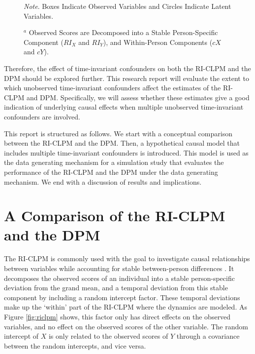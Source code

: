 \documentclass[
  a4paper,
  stu,
  floatsintext,
  donotrepeattitle]{apa7}
\begin{document}
\begin{figure}
\begin{minipage}[t]{\linewidth}
{\centering 

\begin{flushleft}
\textit{Note}. Boxes Indicate Observed Variables
and Circles Indicate Latent Variables.

$^a$ Observed Scores are Decomposed into a Stable Person-Specific
Component ($RI_X$ and $RI_Y$), and Within-Person Components ($cX$ and
$cY$).
\end{flushleft}

}

\end{minipage}%

\end{figure}

Therefore, the effect of time-invariant confounders on both the RI-CLPM
and the DPM should be explored further. This research report will
evaluate the extent to which unobserved time-invariant confounders
affect the estimates of the RI-CLPM and DPM. Specifically, we will
assess whether these estimates give a good indication of underlying
causal effects when multiple unobserved time-invariant confounders are
involved.

This report is structured as follows. We start with a conceptual
comparison between the RI-CLPM and the DPM. Then, a hypothetical causal
model that includes multiple time-invariant confounders is introduced.
This model is used as the data generating mechanism for a simulation
study that evaluates the performance of the RI-CLPM and the DPM under
the data generating mechanism. We end with a discussion of results and
implications.

\hypertarget{a-comparison-of-the-ri-clpm-and-the-dpm}{%
\section{A Comparison of the RI-CLPM and the
DPM}\label{a-comparison-of-the-ri-clpm-and-the-dpm}}

The RI-CLPM is commonly used with the goal to investigate causal
relationships between variables while accounting for stable
between-person differences \autocite{hamaker2015}. It decomposes the
observed scores of an individual into a stable person-specific deviation
from the grand mean, and a temporal deviation from this stable component
by including a random intercept factor. These temporal deviations make
up the `within' part of the RI-CLPM where the dynamics are modeled. As
Figure \ref{fig:riclpm} shows, this factor only has direct effects on
the observed variables, and no effect on the observed scores of the
other variable. The random intercept of \(X\) is only related to the
observed scores of \(Y\) through a covariance between the random
intercepts, and vice versa.
\end{document}
